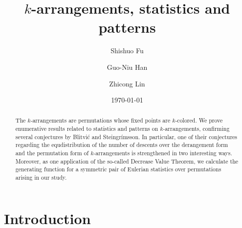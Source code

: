 \documentclass[12pt]{amsart} %
\numberwithin{equation}{section}
\theoremstyle{plain}
\theoremstyle{definition}
\begin{document}
\title[$k$-arrangements]{ $k$-arrangements, statistics and  patterns}


\author[S. Fu]{Shishuo Fu}
\address[Shishuo Fu]{College of Mathematics and Statistics, Chongqing University, Huxi campus, Chongqing 401331, P.R. China}

\author[G.-N. Han]{Guo-Niu Han}
\address[Guo-Niu Han]{I.R.M.A., UMR 7501, Universit\'e de Strasbourg et CNRS, 7 rue Ren\'e Descartes, F-67084 Strasbourg, France}

\author[Z. Lin]{Zhicong Lin}
\address[Zhicong Lin]{Research Center for Mathematics and Interdisciplinary Sciences, Shandong University, Qingdao 266237, P.R. China}
\date{\today}

\begin{abstract} The $k$-arrangements  are permutations whose fixed points are $k$-colored. We prove enumerative results related to statistics and patterns on $k$-arrangements, confirming  several conjectures by Blitvi\'c and Steingr\'imsson.  In particular, one of their conjectures regarding the equdistribution of the number of descents over the derangement form and the permutation form of $k$-arrangements is strengthened in two interesting ways. Moreover, as one application of the so-called Decrease Value Theorem, we calculate the generating function for a symmetric pair of Eulerian statistics over permutations arising in our study. 
\end{abstract}


\maketitle


\section{Introduction}\label{sec:intro} %
\end{document}
